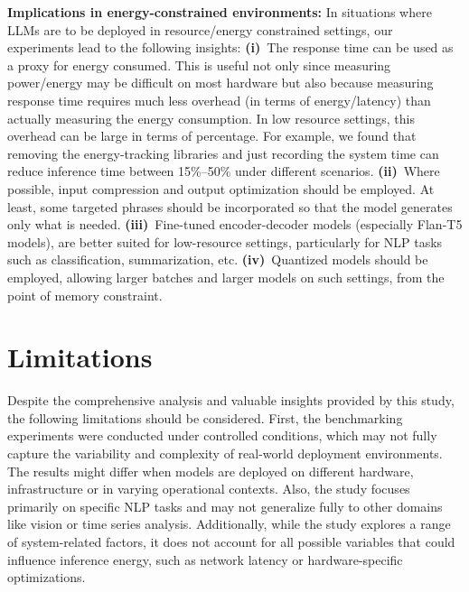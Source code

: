 \vspace{2mm}
\noindent \textbf{Implications in energy-constrained environments:} In situations where LLMs are to be deployed in resource/energy constrained settings, our experiments lead to the following insights: 
\textbf{(i)}~The response time can be used as a proxy for energy consumed. This is useful not only since measuring power/energy may be difficult on most hardware but also because measuring response time requires much less overhead (in terms of energy/latency) than actually measuring the energy consumption. In low resource settings, this overhead can be large in terms of percentage. For example, we found that removing the energy-tracking libraries and just recording the system time can reduce inference time between 15\%--50\% under different scenarios.
\textbf{(ii)}~Where possible, input compression and output optimization should be employed. At least, some targeted phrases should be incorporated so that the model generates only what is needed.
\textbf{(iii)}~Fine-tuned encoder-decoder models (especially Flan-T5 models), are better suited for low-resource settings, particularly for NLP tasks such as classification, summarization, etc. 
\textbf{(iv)}~Quantized models should be employed, allowing larger batches and larger models on such settings, from the point of memory constraint.  

\vspace{2mm}





\section*{Limitations}
Despite the comprehensive analysis and valuable insights provided by this study, the following limitations should be considered. First, the benchmarking experiments were conducted under controlled conditions, which may not fully capture the variability and complexity of real-world deployment environments. The results might differ when models are deployed on different hardware, infrastructure or in varying operational contexts.
Also, the study focuses primarily on specific NLP tasks and may not generalize fully to other domains like vision or time series analysis. Additionally, while the study explores a range of system-related factors, it does not account for all possible variables that could influence inference energy, such as network latency or hardware-specific optimizations.

